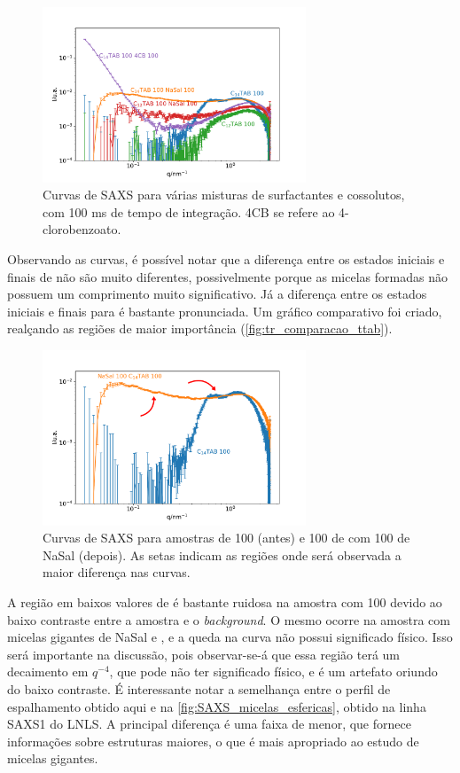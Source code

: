 	\begin{figure}[h]
		\centering
		\includegraphics[width=0.7\textwidth]{imagens/saxs/FT_amostras}
		\caption{Curvas de SAXS para várias misturas de surfactantes e cossolutos, com 100 ms de tempo de integração. 4CB se refere ao 4-clorobenzoato.}
		\label{fig:ft_preliminar}
	\end{figure}

	Observando as curvas, é possível notar que a diferença entre os estados iniciais e finais de \DTAB{} não são muito diferentes, possivelmente porque as micelas formadas não possuem um comprimento muito significativo. Já a diferença entre os estados iniciais e finais para \TTAB{} é bastante pronunciada. Um gráfico comparativo foi criado, realçando as regiões de maior importância (\autoref{fig:tr_comparacao_ttab}).
	
	\begin{figure}[h]
		\centering
		\includegraphics[width=0.7\textwidth]{imagens/saxs/tr_comparacao_antes_depois}
		\caption{Curvas de SAXS para amostras de \TTAB{} 100\mM{} (antes) e 100 \mM de \TTAB{} com 100 \mM{} de NaSal (depois). As setas indicam as regiões onde será observada a maior diferença nas curvas.}
		\label{fig:tr_comparacao_ttab}
	\end{figure}
	
	A região em baixos valores de \q{} é bastante ruidosa na amostra com \TTAB{} 100 \mM{} devido ao baixo contraste entre a amostra e o \emph{background}. O mesmo ocorre na amostra com micelas gigantes de NaSal e \TTAB, e a queda na curva não possui significado físico. Isso será importante na discussão, pois observar-se-á que essa região terá um decaimento em \(q^{-4}\), que pode não ter significado físico, e é um artefato oriundo do baixo contraste. É interessante notar a semelhança entre o perfil de espalhamento obtido aqui e na \autoref{fig:SAXS_micelas_esfericas}, obtido na linha SAXS1 do LNLS. A principal diferença é uma faixa de \q{} menor, que fornece informações sobre estruturas maiores, o que é mais apropriado ao estudo de micelas gigantes.
	
